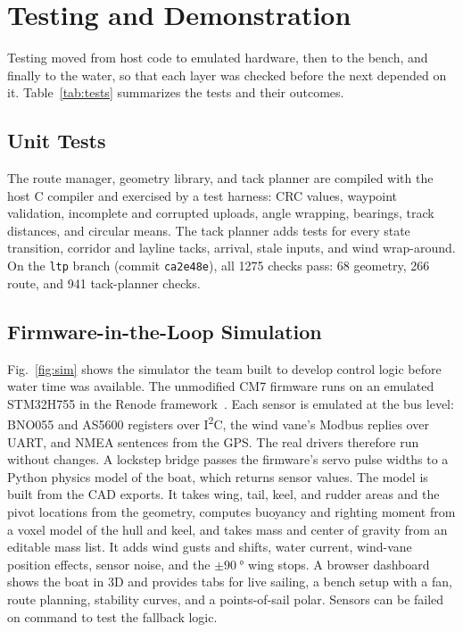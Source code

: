 \section{Testing and Demonstration}
\label{sec:test}

Testing moved from host code to emulated hardware, then to the bench, and
finally to the water, so that each layer was checked before the next depended
on it. Table~\ref{tab:tests} summarizes the tests and their outcomes.

\subsection{Unit Tests}
The route manager, geometry library, and tack planner are compiled with the host C compiler
and exercised by a test harness: CRC values, waypoint validation, incomplete
and corrupted uploads, angle wrapping, bearings, track distances, and circular
means. The tack planner adds tests for every state transition, corridor
and layline tacks, arrival, stale inputs, and wind wrap-around. On the
\texttt{ltp} branch (commit \texttt{ca2e48e}), all 1275 checks pass: 68
geometry, 266 route, and 941 tack-planner checks.

\subsection{Firmware-in-the-Loop Simulation}
Fig.~\ref{fig:sim} shows the simulator the team built to develop control
logic before water time was available. The unmodified CM7 firmware runs on an
emulated STM32H755 in the Renode framework~\cite{renode}. Each sensor is
emulated at the bus level: BNO055 and AS5600 registers over
I\textsuperscript{2}C, the wind vane's Modbus replies over UART, and NMEA
sentences from the GPS. The real drivers therefore run without changes. A
lockstep bridge passes the firmware's servo pulse widths to a Python physics
model of the boat, which returns sensor values. The model is built from the
CAD exports. It takes wing, tail, keel, and rudder areas and the pivot
locations from the geometry, computes buoyancy and righting moment from a
voxel model of the hull and keel, and takes mass and center of gravity from an
editable mass list. It adds wind gusts and shifts, water current, wind-vane
position effects, sensor noise, and the $\pm\SI{90}{\degree}$ wing stops. A
browser dashboard shows the boat in 3D and provides tabs for live sailing,
a bench setup with a fan, route planning, stability curves, and a
points-of-sail polar. Sensors can be failed on command to test the fallback
logic.

